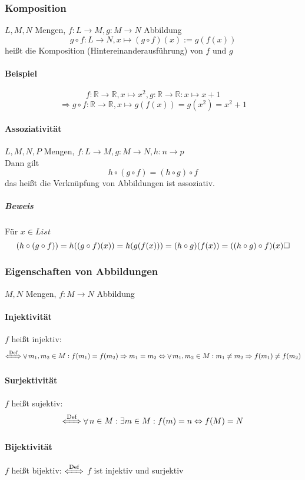 \documentclass[a4paper]{scrartcl}
\DeclareMathOperator{\Forall}{\forall}
\begin{document}
\subsubsection{Komposition}
\label{sec-2-6-6}
$L,M,N$ Mengen, $f:L\to M,g:M\to N$ Abbildung \\
    \[g\circ f: L\to N, x\mapsto(g\circ f)(x):=g(f(x))\]
heißt die Komposition (Hintereinanderausführung) von $f$ und $g$
\paragraph{Beispiel}
\label{sec-2-6-6-1}
\[f:\mathbb{R}\to\mathbb{R},x\mapsto x^2, g:\mathbb{R}\to\mathbb{R}:x\mapsto x + 1\]
\[\Rightarrow g\circ f:\mathbb{R}\to\mathbb{R},x\mapsto g(f(x)) = g(x^2) = x^2 + 1\]
\paragraph{Assoziativität}
\label{sec-2-6-6-2}
$L,M,N,P$ Mengen, $f:L\to M, g:M\to N,h:n\to p$ \\
     Dann gilt
\[h\circ (g\circ f) = (h\circ g)\circ f\]
das heißt die Verknüpfung von Abbildungen ist assoziativ.
\subparagraph{Beweis}
\label{sec-2-6-6-2-1}
Für $x\in L ist$ \\
      \[(h\circ (g\circ f)) = h((g\circ f)(x)) = h(g(f(x))) = (h\circ g)(f(x)) = ((h\circ g)\circ f)(x)\hfill\square\]
\subsubsection{Eigenschaften von Abbildungen}
\label{sec-2-6-7}
$M,N$ Mengen, $f:M\to N$ Abbildung
\paragraph{Injektivität}
\label{sec-2-6-7-1}
$f$ heißt injektiv: \[\xLeftrightarrow{\text{Def}} \Forall m_1,m_2\in M: f(m_1) = f(m_2) \Rightarrow m_1 = m_2 \Leftrightarrow \Forall m_1,m_2\in M: m_1\neq m_2 \Rightarrow f(m_1)\neq f(m_2)\]
\paragraph{Surjektivität}
\label{sec-2-6-7-2}
$f$ heißt sujektiv:
\[\xLeftrightarrow{\text{Def}} \Forall n\in M :\exists m\in M: f(m) = n \Leftrightarrow f(M) = N\]
\paragraph{Bijektivität}
\label{sec-2-6-7-3}
$f$ heißt bijektiv: $\xLeftrightarrow{\text{Def}}$ $f$ ist injektiv und surjektiv
\end{document}

